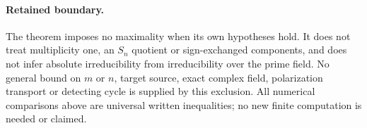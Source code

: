 \paragraph{Retained boundary.}
The theorem imposes no maximality when its own hypotheses hold.
It does not treat multiplicity one, an $S_n$ quotient or sign-exchanged
components, and does not infer absolute irreducibility from
irreducibility over the prime field. No general bound on $m$ or $n$,
target source, exact complex field, polarization transport or detecting
cycle is supplied by this exclusion. All numerical comparisons above
are universal written inequalities; no new finite computation is
needed or claimed.
